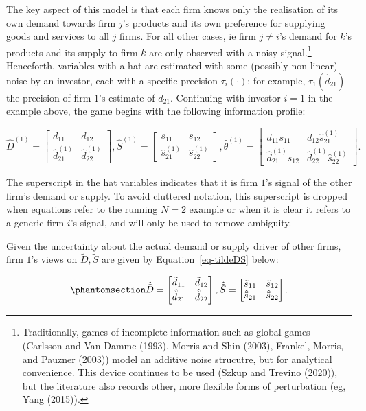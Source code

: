 \documentclass[
]{article}
\theoremstyle{definition}
\theoremstyle{plain}
\theoremstyle{remark}
\begin{document}
The key aspect of this model is that each firm knows only the
realisation of its own demand towards firm \(j\)'s products and its own
preference for supplying goods and services to all \(j\) firms. For all
other cases, ie firm \(j \neq i\)'s demand for \(k\)'s products and its
supply to firm \(k\) are only observed with a noisy signal.\footnote{Traditionally,
  games of incomplete information such as global games (Carlsson and Van
  Damme (1993), Morris and Shin (2003), Frankel, Morris, and Pauzner
  (2003)) model an additive noise strucutre, but for analytical
  convenience. This device continues to be used (Szkup and Trevino
  (2020)), but the literature also records other, more flexible forms of
  perturbation (eg, Yang (2015)).} Henceforth, variables with a hat are
estimated with some (possibly non-linear) noise by an investor, each
with a specific precision \(\tau_i(\cdot)\); for example,
\(\tau_1(\hat{d}_{21})\) the precision of firm \(1\)'s estimate of
\(d_{21}\). Continuing with investor \(i=1\) in the example above, the
game begins with the following information profile:

\[
\hat{D}^{(1)} = 
\begin{bmatrix}
d_{11} & d_{12} \\
\hat{d}_{21}^{(1)} & \hat{d}_{22}^{(1)}
\end{bmatrix}
,
\hat{S}^{(1)} = 
\begin{bmatrix}
s_{11} & s_{12} \\
\hat{s}_{21}^{(1)} & \hat{s}_{22}^{(1)}
\end{bmatrix}
,
\hat{\theta}^{(1)} = 
\begin{bmatrix}
d_{11}s_{11} & d_{12}\hat{s}_{21}^{(1)} \\
\hat{d}_{21}^{(1)} s_{12} & \hat{d}_{22}^{(1)} \hat{s}_{22}^{(1)}
\end{bmatrix}.
\]

The superscript in the hat variables indicates that it is firm \(1\)'s
signal of the other firm's demand or supply. To avoid cluttered
notation, this superscript is dropped when equations refer to the
running \(N=2\) example or when it is clear it refers to a generic firm
\(i\)'s signal, and will only be used to remove ambiguity.

Given the uncertainty about the actual demand or supply driver of other
firms, firm \(1\)'s views on \(\tilde{D}, \tilde{S}\) are given by
Equation~\ref{eq-tildeDS} below:

\begin{equation}\phantomsection\label{eq-tildeDS}{
\hat{\tilde{D}} = 
\begin{bmatrix}
\tilde{d}_{11} & \tilde{d}_{12} \\
\hat{\tilde{d}}_{21} & \hat{\tilde{d}}_{22}
\end{bmatrix}
,
\hat{\tilde{S}} = 
\begin{bmatrix}
\tilde{s}_{11} & \tilde{s}_{12} \\
\hat{\tilde{s}}_{21} & \hat{\tilde{s}}_{22}
\end{bmatrix}.
}\end{equation}
\end{document}
